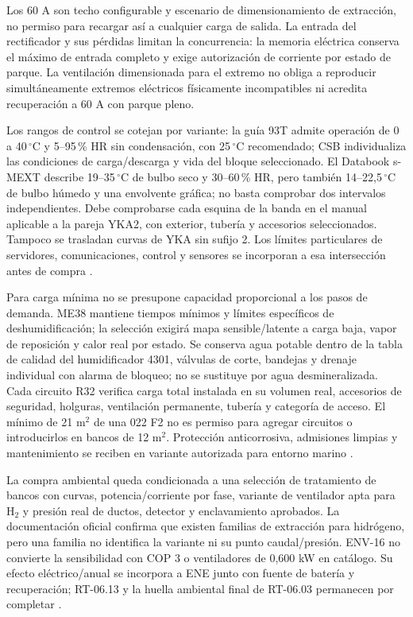 Los 60 A son techo configurable y escenario de dimensionamiento de extracción, no permiso para recargar así a cualquier carga de salida. La entrada del rectificador y sus pérdidas limitan la concurrencia: la memoria eléctrica conserva el máximo de entrada completo y exige autorización de corriente por estado de parque. La ventilación dimensionada para el extremo no obliga a reproducir simultáneamente extremos eléctricos físicamente incompatibles ni acredita recuperación a 60 A con parque pleno.

Los rangos de control se cotejan por variante: la guía 93T admite operación de 0 a 40\,$^{\circ}$C y 5--95\,\% HR sin condensación, con 25\,$^{\circ}$C recomendado; CSB individualiza las condiciones de carga/descarga y vida del bloque seleccionado. El Databook s-MEXT describe 19--35\,$^{\circ}$C de bulbo seco y 30--60\,\% HR, pero también 14--22,5\,$^{\circ}$C de bulbo húmedo y una envolvente gráfica; no basta comprobar dos intervalos independientes. Debe comprobarse cada esquina de la banda en el manual aplicable a la pareja YKA2, con exterior, tubería y accesorios seleccionados. Tampoco se trasladan curvas de YKA sin sufijo 2. Los límites particulares de servidores, comunicaciones, control y sensores se incorporan a esa intersección antes de compra \parencites[secc.~8]{p7-eaton-93t-guia}{csbHRL12540WRA260131}[p.~16]{p6-mext-databook}.

Para carga mínima no se presupone capacidad proporcional a los pasos de demanda. ME38 mantiene tiempos mínimos y límites específicos de deshumidificación; la selección exigirá mapa sensible/latente a carga baja, vapor de reposición y calor real por estado. Se conserva agua potable dentro de la tabla de calidad del humidificador 4301, válvulas de corte, bandejas y drenaje individual con alarma de bloqueo; no se sustituye por agua desmineralizada. Cada circuito R32 verifica carga total instalada en su volumen real, accesorios de seguridad, holguras, ventilación permanente, tubería y categoría de acceso. El mínimo de 21 m$^2$ de una 022 F2 no es permiso para agregar circuitos o introducirlos en bancos de 12 m$^2$. Protección anticorrosiva, admisiones limpias y mantenimiento se reciben en variante autorizada para entorno marino \parencites[pp.~139--149]{p6-mext-control-me38}[p.~42]{p6-mext-databook}[secc.~2.2.5--2.2.7]{p9-mext-manual-2024}.

La compra ambiental queda condicionada a una selección de tratamiento de bancos con curvas, potencia/corriente por fase, variante de ventilador apta para H$_2$ y presión real de ductos, detector y enclavamiento aprobados. La documentación oficial confirma que existen familias de extracción para hidrógeno, pero una familia no identifica la variante ni su punto caudal/presión. ENV-16 no convierte la sensibilidad con COP 3 o ventiladores de 0,600 kW en catálogo. Su efecto eléctrico/anual se incorpora a ENE junto con fuente de batería y recuperación; RT-06.13 y la huella ambiental final de RT-06.03 permanecen por completar \parencite{lote16-systemair-ex}.

